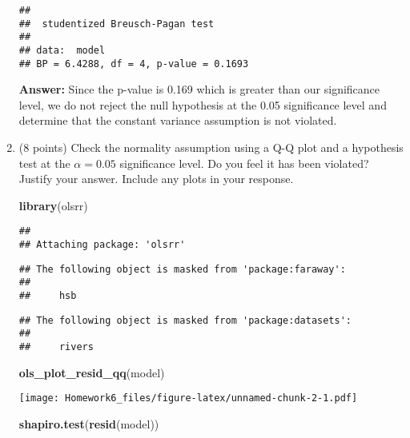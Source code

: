 \documentclass[
]{article}
\newenvironment{Shaded}{\begin{snugshade}}{\end{snugshade}}
\newcommand{\FunctionTok}[1]{\textcolor[rgb]{0.13,0.29,0.53}{\textbf{#1}}}
\newcommand{\NormalTok}[1]{#1}
\newcommand{\StringTok}[1]{\textcolor[rgb]{0.31,0.60,0.02}{#1}}
\begin{document}
\begin{enumerate}
\begin{verbatim}
## 
##  studentized Breusch-Pagan test
## 
## data:  model
## BP = 6.4288, df = 4, p-value = 0.1693
\end{verbatim}

  \textbf{Answer:} Since the p-value is 0.169 which is greater than our
  significance level, we do not reject the null hypothesis at the 0.05
  significance level and determine that the constant variance assumption
  is not violated.
\item
  (8 points) Check the normality assumption using a Q-Q plot and a
  hypothesis test at the \(\alpha = 0.05\) significance level. Do you
  feel it has been violated? Justify your answer. Include any plots in
  your response.

\begin{Shaded}
\begin{Highlighting}[]
\FunctionTok{library}\NormalTok{(}\StringTok{\textquotesingle{}olsrr\textquotesingle{}}\NormalTok{)}
\end{Highlighting}
\end{Shaded}

\begin{verbatim}
## 
## Attaching package: 'olsrr'
\end{verbatim}

\begin{verbatim}
## The following object is masked from 'package:faraway':
## 
##     hsb
\end{verbatim}

\begin{verbatim}
## The following object is masked from 'package:datasets':
## 
##     rivers
\end{verbatim}

\begin{Shaded}
\begin{Highlighting}[]
\FunctionTok{ols\_plot\_resid\_qq}\NormalTok{(model)}
\end{Highlighting}
\end{Shaded}

  \texttt{[image: Homework6\_files/figure-latex/unnamed-chunk-2-1.pdf]}

\begin{Shaded}
\begin{Highlighting}[]
\FunctionTok{shapiro.test}\NormalTok{(}\FunctionTok{resid}\NormalTok{(model))}
\end{Highlighting}
\end{Shaded}


\end{enumerate}
\end{document}
